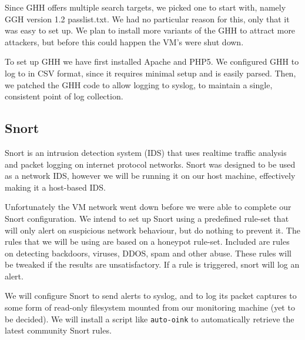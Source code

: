 \documentclass[11pt]{article} %
\begin{document}
Since GHH offers multiple search targets, we picked one to start with, namely GGH version 1.2 passlist.txt.
We had no particular reason for this, only that it was easy to set up. 
We plan to install more variants of the GHH to attract more attackers, but before this could happen the VM's were shut down.

To set up GHH we have first installed Apache and PHP5.
We configured GHH to log to in CSV format, since it requires minimal setup and is easily parsed.
Then, we patched the GHH code to allow logging to syslog, to maintain a single, consistent point of log collection.

\subsection{Snort}
Snort is an intrusion detection system (IDS) that uses realtime traffic analysis and packet logging on internet protocol networks.
Snort was designed to be used as a network IDS, however we will be running it on our host machine, effectively making it a host-based IDS.

Unfortunately the VM network went down before we were able to complete our Snort configuration.
We intend to set up Snort using a predefined rule-set that will only alert on suspicious network behaviour, but do nothing to prevent it. 
The rules that we will be using are based on a honeypot rule-set. %
Included are rules on detecting backdoors, viruses, DDOS, spam and other abuse.
These rules will be tweaked if the results are unsatisfactory.
If a rule is triggered, snort will log an alert.

We will configure Snort to send alerts to syslog, and to log its packet captures to some form of read-only filesystem mounted from our monitoring machine (yet to be decided).
We will install a script like \verb|auto-oink| to automatically retrieve the latest community Snort rules.



\end{document}
